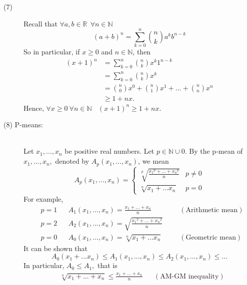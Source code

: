 \begin{description}
    \item[(7)] Recall that $\forall a,b \in \mathbb{R} ~~\forall n \in \mathbb{N}$
    $$(a+b)^n= \sum \limits_{k=0}^n \binom nk a^kb^{n-k}$$
    So in particular, if $x \geq 0$ and $n \in \mathbb{N}$, then 
    \begin{align*} (x+1)^n &= \sum \limits_{k=0}^n \binom nk x^k 1^{n-k} \\ &=\sum \limits_{k=0}^n \binom nk x^k \\ &= \binom n0 x^0 + \binom n1 x^1 + ... + \binom nn x^n \\ &\geq1 + nx.
    \end{align*}
    Hence, $\forall x \geq 0 ~\forall n \in \mathbb{N} ~~~~(x+1)^n \geq 1 + nx.$
\end{description}

\begin{description}
    \item[(8) P-means: ] \leavevmode \\
    Let $x_1,...,x_n$ be positive real numbers. Let $p \in \mathbb{N} \cup {0}$. By the p-mean of $x_1, ..., x_n,$ denoted by $A_p(x_1, ..., x_n)$, we mean
    $$A_p(x_1, ..., x_n) = \begin{cases} \sqrt[p]{\frac{{x_1}^p+...+{x_n}^p }{n}} &p\not = 0 \\ \sqrt[n]{x_1+...x_n} &p=0 \end{cases}$$
    For example,
    \begin{align*}&p=1 &&A_1(x_1,...,x_n)=\frac{x_1+...+x_n}{n} &&&(\text{Arithmetic mean}) \\ &p=2 &&A_2(x_1, ..., x_n)= \sqrt{\frac{{x_1}^2+...+{x_n}^2}{n}} &&& \\ &p=0 && A_0(x_1,...,x_n) = \sqrt[n]{x_1+...x_n} &&& (\text{Geometric mean}) \end{align*}
    It can be shown that
    $$A_0(x_1+...x_n) \leq A_1(x_1,...,x_n) \leq A_2(x_1,...,x_n) \leq...$$
    In particular, $A_0 \leq A_1,$ that is 
    \begin{align*} &\sqrt[n]{x_1 + ... + x_n} \leq \frac{x_1+...+x_n}{n} &&(\text{AM-GM inequality}) \end{align*}
\end{description}

